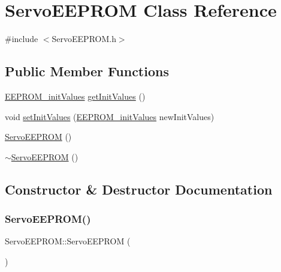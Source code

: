 \hypertarget{class_servo_e_e_p_r_o_m}{}\section{Servo\+E\+E\+P\+R\+OM Class Reference}
\label{class_servo_e_e_p_r_o_m}


{\ttfamily \#include $<$Servo\+E\+E\+P\+R\+O\+M.\+h$>$}

\subsection*{Public Member Functions}
\begin{DoxyCompactItemize}
\item 
\hyperlink{struct_e_e_p_r_o_m__init_values}{E\+E\+P\+R\+O\+M\+\_\+init\+Values} \hyperlink{class_servo_e_e_p_r_o_m_ac6e03a1694107eed257a171e01d37029}{get\+Init\+Values} ()
\item 
void \hyperlink{class_servo_e_e_p_r_o_m_a0051b754f421b6bf445382e451e49c46}{set\+Init\+Values} (\hyperlink{struct_e_e_p_r_o_m__init_values}{E\+E\+P\+R\+O\+M\+\_\+init\+Values} new\+Init\+Values)
\item 
\hyperlink{class_servo_e_e_p_r_o_m_a966a3f74229625825f68dacf65592897}{Servo\+E\+E\+P\+R\+OM} ()
\item 
\hyperlink{class_servo_e_e_p_r_o_m_a5cecb1d16d1dbd8cf1530a808288451d}{$\sim$\+Servo\+E\+E\+P\+R\+OM} ()
\end{DoxyCompactItemize}


\subsection{Constructor \& Destructor Documentation}
\mbox{\label{class_servo_e_e_p_r_o_m_a966a3f74229625825f68dacf65592897}} 
\subsubsection{\texorpdfstring{Servo\+E\+E\+P\+R\+O\+M()}{ServoEEPROM()}}
{\footnotesize\ttfamily Servo\+E\+E\+P\+R\+O\+M\+::\+Servo\+E\+E\+P\+R\+OM (\begin{DoxyParamCaption}{ }\end{DoxyParamCaption})}

